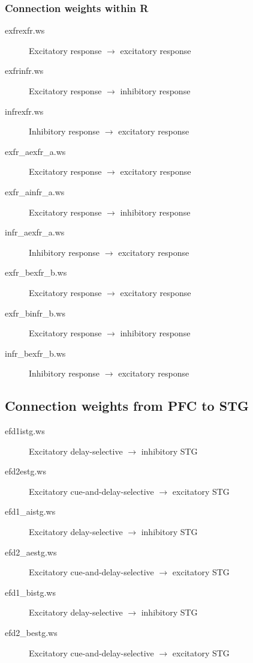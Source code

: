 \documentclass[12pt]{article}
\begin{document}
\subsubsection{Connection weights within R}
\begin{description}
  \item[exfrexfr.ws] Excitatory response $\rightarrow$ 
                     excitatory response
  \item[exfrinfr.ws] Excitatory response $\rightarrow$
                     inhibitory response
  \item[infrexfr.ws] Inhibitory response $\rightarrow$
                     excitatory response
  \item[exfr\_aexfr\_a.ws] Excitatory response $\rightarrow$ 
                     excitatory response
  \item[exfr\_ainfr\_a.ws] Excitatory response $\rightarrow$
                     inhibitory response
  \item[infr\_aexfr\_a.ws] Inhibitory response $\rightarrow$
                     excitatory response
  \item[exfr\_bexfr\_b.ws] Excitatory response $\rightarrow$ 
                     excitatory response
  \item[exfr\_binfr\_b.ws] Excitatory response $\rightarrow$
                     inhibitory response
  \item[infr\_bexfr\_b.ws] Inhibitory response $\rightarrow$
                     excitatory response
\end{description}

\subsection{Connection weights from PFC to STG}
\begin{description}
  \item[efd1istg.ws] Excitatory delay-selective $\rightarrow$
                     inhibitory STG
  \item[efd2estg.ws] Excitatory cue-and-delay-selective $\rightarrow$
                     excitatory STG
  \item[efd1\_aistg.ws] Excitatory delay-selective $\rightarrow$
                     inhibitory STG
  \item[efd2\_aestg.ws] Excitatory cue-and-delay-selective $\rightarrow$
                     excitatory STG
  \item[efd1\_bistg.ws] Excitatory delay-selective $\rightarrow$
                     inhibitory STG
  \item[efd2\_bestg.ws] Excitatory cue-and-delay-selective $\rightarrow$
                     excitatory STG
\end{description}
\end{document}
